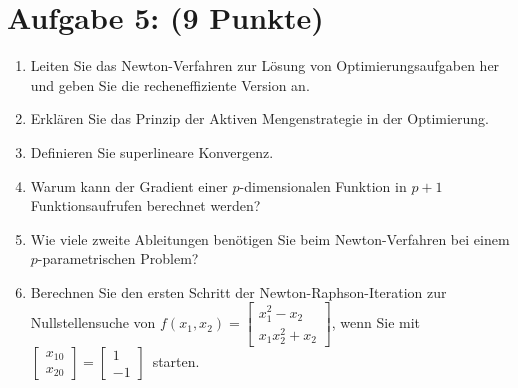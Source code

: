 \documentclass[12pt]{article}
\begin{document}
\newcommand{\raphsonFunction}{
	$f(x_1,x_2) =
		\begin{bmatrix}
			x_1^2 - x_2 \\ x_1x_2^2 + x_2
		\end{bmatrix}$}

\newcommand{\raphsonStartVal}{
	$\begin{bmatrix}x_{10} \\ x_{20}\end{bmatrix}
		=
		\begin{bmatrix}1\\ -1\end{bmatrix}$}

\section*{Aufgabe 5: (9 Punkte)}
\begin{enumerate}
	\item Leiten Sie das Newton-Verfahren zur Lösung von Optimierungsaufgaben her und geben Sie die recheneffiziente Version an.

	      \vspace{4cm}

	\item Erklären Sie das Prinzip der Aktiven Mengenstrategie in der Optimierung.

	      \vspace{2cm}

	\item Definieren Sie superlineare Konvergenz.

	      \vspace{2cm}

	\item Warum kann der Gradient einer $p$-dimensionalen Funktion in $p+1$ Funktionsaufrufen berechnet werden?

	      \vspace{1.5cm}

	\item Wie viele zweite Ableitungen benötigen Sie beim Newton-Verfahren bei einem $p$-parametrischen Problem?

	      \vspace{1.5cm}

	\item Berechnen Sie den ersten Schritt der Newton-Raphson-Iteration zur Nullstellensuche von \raphsonFunction, wenn Sie mit \raphsonStartVal\, starten.

\end{enumerate}
\pagebreak
\end{document}
